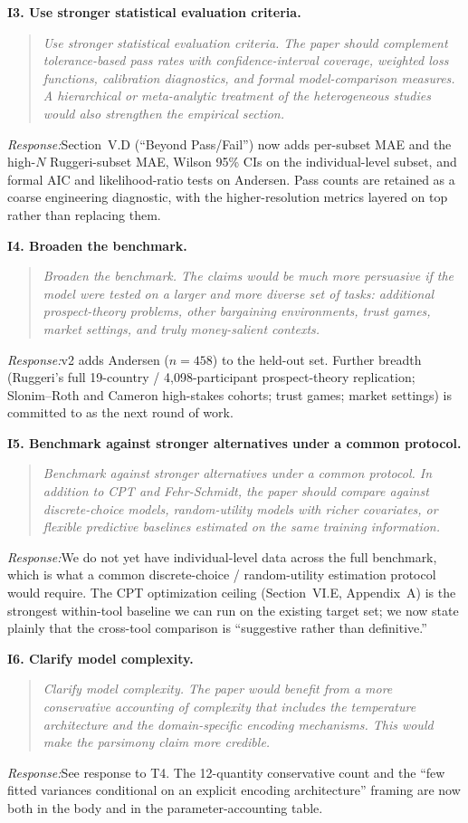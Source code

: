\documentclass[11pt]{article}
\newcommand{\rev}[1]{\textbf{#1}}
\newcommand{\resp}{\medskip\noindent\emph{Response:}\quad}
\begin{document}
\rev{I3. Use stronger statistical evaluation criteria.}
\begin{quote}\itshape\small
Use stronger statistical evaluation criteria. The paper should complement tolerance-based pass rates with confidence-interval coverage, weighted loss functions, calibration diagnostics, and formal model-comparison measures. A hierarchical or meta-analytic treatment of the heterogeneous studies would also strengthen the empirical section.
\end{quote}
\resp Section~V.D (``Beyond Pass/Fail'') now adds per-subset MAE and the high-$N$ Ruggeri-subset MAE, Wilson 95\% CIs
on the individual-level subset, and formal AIC and likelihood-ratio tests on Andersen.
Pass counts are retained as a coarse engineering diagnostic, with the higher-resolution
metrics layered on top rather than replacing them.

\rev{I4. Broaden the benchmark.}
\begin{quote}\itshape\small
Broaden the benchmark. The claims would be much more persuasive if the model were tested on a larger and more diverse set of tasks: additional prospect-theory problems, other bargaining environments, trust games, market settings, and truly money-salient contexts.
\end{quote}
\resp v2 adds Andersen ($n=458$) to the held-out set. Further breadth (Ruggeri's full
19-country / 4{,}098-participant prospect-theory replication; Slonim--Roth and Cameron
high-stakes cohorts; trust games; market settings) is committed to as the next round of
work.

\rev{I5. Benchmark against stronger alternatives under a common protocol.}
\begin{quote}\itshape\small
Benchmark against stronger alternatives under a common protocol. In addition to CPT and Fehr-Schmidt, the paper should compare against discrete-choice models, random-utility models with richer covariates, or flexible predictive baselines estimated on the same training information.
\end{quote}
\resp We do not yet have individual-level data across the full benchmark, which is what a
common discrete-choice / random-utility estimation protocol would require. The CPT
optimization ceiling (Section~VI.E, Appendix~A) is the strongest within-tool baseline we
can run on the existing target set; we now state plainly that the cross-tool comparison
is ``suggestive rather than definitive.''

\rev{I6. Clarify model complexity.}
\begin{quote}\itshape\small
Clarify model complexity. The paper would benefit from a more conservative accounting of complexity that includes the temperature architecture and the domain-specific encoding mechanisms. This would make the parsimony claim more credible.
\end{quote}
\resp See response to T4. The 12-quantity conservative count and the
``few fitted variances conditional on an explicit encoding architecture'' framing are now
both in the body and in the parameter-accounting table.
\end{document}
